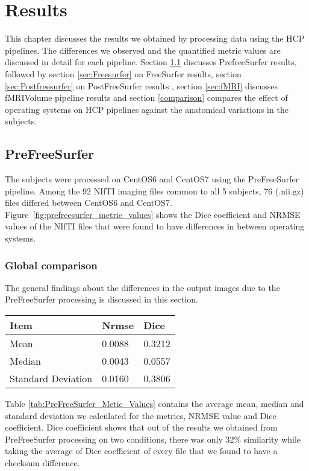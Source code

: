 \chapter{Results}\label{results}
This chapter discusses the results we obtained by processing data using the HCP pipelines. The differences we observed and the quantified metric values are discussed in detail for each pipeline. Section \ref{sec:Prefreesurfer} discusses PrefreeSurfer results, followed by section \ref{sec:Freesurfer} on FreeSurfer results, section \ref{sec:Postfreesurfer} on PostFreeSurfer results , section \ref{sec:fMRI} discusses fMRIVolume pipeline results and section \ref{comparison} compares the effect of operating systems on HCP pipelines against the anatomical variations in the subjects.

\section{PreFreeSurfer} \label{sec:Prefreesurfer}
The subjects were processed on CentOS6 and CentOS7 using the PreFreeSurfer pipeline. Among the 92 NIfTI imaging files common to all 5 subjects, 76 (.nii.gz) files differed between CentOS6 and CentOS7. Figure~\ref{fig:prefreesurfer_metric_values} shows the Dice coefficient and NRMSE values of the NIfTI files that were found to have differences in between operating systems.

\subsection{Global comparison}
The general findings about the differences in the output images due to the PreFreeSurfer processing is discussed in this section.

\begin{center}
\begin{tabular}{|l|l|l|}
\hline
\textbf{Item}      & \textbf{Nrmse} & \textbf{Dice} \\ \hline
Mean               & 0.0088   & 0.3212   \\ \hline
Median             & 0.0043    & 0.0557    \\ \hline
Standard Deviation & 0.0160    & 0.3806   \\ \hline
\end{tabular}
\label{tab:PreFreeSurfer_Metic_Values}
\end{center}

Table \ref{tab:PreFreeSurfer_Metic_Values} contains the average mean, median and standard deviation we calculated for the metrics, NRMSE value and Dice coefficient. Dice coefficient shows that out of the results we obtained from PreFreeSurfer processing on two conditions, there was only 32\% similarity while taking the average of Dice coefficient of every file that we found to have a checksum difference.

